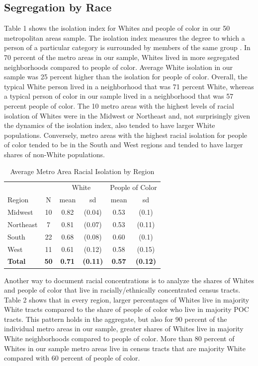 \documentclass[11pt,]{article}
\begin{document}
\hypertarget{segregation-by-race}{%
\subsection{Segregation by Race}\label{segregation-by-race}}

Table 1 shows the isolation index for Whites and people of color in our
50 metropolitan areas sample. The isolation index measures the degree to
which a person of a particular category is surrounded by members of the
same group \autocite{massey1989hs}. In 70 percent of the metro areas in
our sample, Whites lived in more segregated neighborhoods compared to
people of color. Average White isolation in our sample was 25 percent
higher than the isolation for people of color. Overall, the typical
White person lived in a neighborhood that was 71 percent White, whereas
a typical person of color in our sample lived in a neighborhood that was
57 percent people of color. The 10 metro areas with the highest levels
of racial isolation of Whites were in the Midwest or Northeast and, not
surprisingly given the dynamics of the isolation index, also tended to
have larger White populations. Conversely, metro areas with the highest
racial isolation for people of color tended to be in the South and West
regions and tended to have larger shares of non-White populations.

\begin{table}[t]

\caption{\label{tab:table1}Average Metro Area Racial Isolation by Region}
\centering
\begin{tabular}{lccccc}
\toprule
\multicolumn{2}{c}{ } & \multicolumn{2}{c}{White} & \multicolumn{2}{c}{People of Color} \\
\cmidrule(l{3pt}r{3pt}){3-4} \cmidrule(l{3pt}r{3pt}){5-6}
Region & N & mean & sd & mean & sd\\
\midrule
Midwest & 10 & 0.82 & (0.04) & 0.53 & (0.1)\\
Northeast & 7 & 0.81 & (0.07) & 0.53 & (0.11)\\
South & 22 & 0.68 & (0.08) & 0.60 & (0.1)\\
West & 11 & 0.61 & (0.12) & 0.58 & (0.15)\\
\textbf{Total} & \textbf{50} & \textbf{0.71} & \textbf{(0.11)} & \textbf{0.57} & \textbf{(0.12)}\\
\bottomrule
\end{tabular}
\end{table}

Another way to document racial concentrations is to analyze the shares
of Whites and people of color that live in racially/ethnically
concentrated census tracts. Table 2 shows that in every region, larger
percentages of Whites live in majority White tracts compared to the
share of people of color who live in majority POC tracts. This pattern
holds in the aggregate, but also for 90 percent of the individual metro
areas in our sample, greater shares of Whites live in majority White
neighborhoods compared to people of color. More than 80 percent of
Whites in our sample metro areas live in census tracts that are majority
White compared with 60 percent of people of color.
\end{document}
